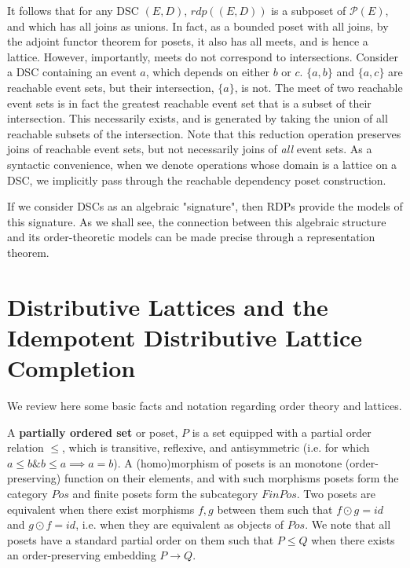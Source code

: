 \documentclass[hoptionsi,review,format=acmsmall]{acmart}
\theoremstyle{definition}
\newcommand{\Pc}{\mathcal{P}}
\newcommand{\band}{\mathbin{\&}}
\begin{document}
It follows that for any DSC \((E,D)\), \(rdp((E,D))\)  is a subposet of \(\Pc(E)\), and which has all joins as unions. In fact, as a bounded poset with all joins, by the adjoint functor theorem for posets, it also has all  meets, and is hence a lattice. However, importantly, meets do not correspond to intersections. Consider a DSC containing an event \(a\), which depends on either \(b\) or \(c\). \(\{a,b\}\) and  \(\{a,c\}\) are reachable event sets, but their intersection, \(\{a\}\), is not. The meet of two reachable event sets is in fact the greatest reachable event set that is a subset of their intersection. This necessarily exists, and is generated by taking the union of all reachable subsets of the intersection. Note that this reduction operation preserves joins of reachable event sets, but not necessarily joins of \textit{all} event sets. As a syntactic convenience, when we denote operations whose domain is a lattice on a DSC, we implicitly pass through the reachable dependency poset construction.

If we consider DSCs as an algebraic "signature", then RDPs provide the models of this signature. As we shall see, the connection between this algebraic structure and its order-theoretic models can be made precise through a representation theorem.

\section{Distributive Lattices and the Idempotent Distributive Lattice Completion}

We review here some basic facts and notation regarding order theory and lattices.

A \textbf{partially ordered set} or poset, \(P\) is a set equipped with a partial order relation \(\le\), which is transitive,  reflexive, and antisymmetric (i.e. for which \( a \le b \band b \le a \implies a = b\)). A (homo)morphism of posets is an monotone (order-preserving) function on their elements, and with such morphisms posets form the category \(Pos\) and finite posets form the subcategory \(FinPos\). Two posets are equivalent when there exist morphisms \(f, g\) between them such that \(f \odot g = id\) and \(g \odot f = id\), i.e. when they are equivalent as objects of \(Pos\). We note that all posets have a standard partial order on them such that \(P \le Q\) when there exists an order-preserving embedding \(P \rightarrow Q\).
\end{document}

